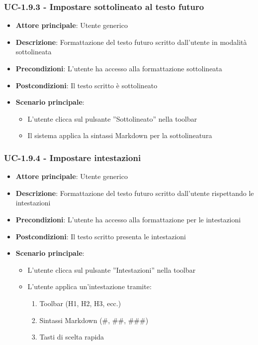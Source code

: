 \documentclass[11pt,a4paper]{article}
\begin{document}
\subsubsection{UC-1.9.3 - Impostare sottolineato al testo futuro}
\begin{itemize}
    \item \textbf{Attore principale}: Utente generico
    \item \textbf{Descrizione}: Formattazione del testo futuro scritto dall’utente in modalità sottolineata

    \item \textbf{Precondizioni}: L’utente ha accesso alla formattazione sottolineata
    \item \textbf{Postcondizioni}: Il testo scritto è sottolineato
    \item \textbf{Scenario principale}:
        \begin{itemize}
            \item L’utente clicca sul pulsante ”Sottolineato” nella toolbar
            \item Il sistema applica la sintassi Markdown per la sottolineatura
        \end{itemize}
\end{itemize}

\subsubsection{UC-1.9.4 - Impostare intestazioni}
\begin{itemize}
    \item \textbf{Attore principale}: Utente generico
    \item \textbf{Descrizione}: Formattazione del testo futuro scritto dall’utente rispettando le intestazioni
    \item \textbf{Precondizioni}: L’utente ha accesso alla formattazione per le intestazioni
    \item \textbf{Postcondizioni}: Il testo scritto presenta le intestazioni
    \item \textbf{Scenario principale}:
        \begin{itemize}
            \item L’utente clicca sul pulsante ”Intestazioni” nella toolbar
            \item L’utente applica un’intestazione tramite:
                \begin{enumerate}
                    \item Toolbar (H1, H2, H3, ecc.)
                    \item Sintassi Markdown (\#, \#\#, \#\#\#)
                    \item Tasti di scelta rapida
                \end{enumerate}
        \end{itemize}
\end{itemize}
\end{document}
